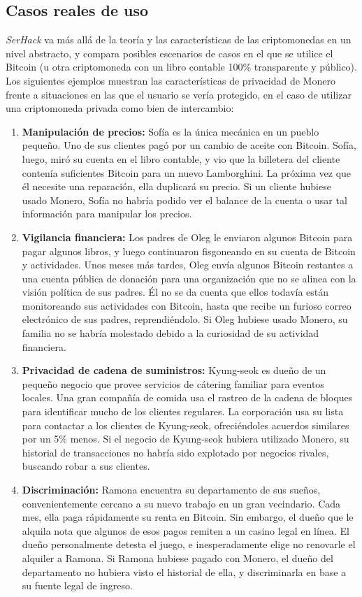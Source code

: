 \documentclass[12pt,a4paper,twoside]{book}
\begin{document}
\subsection{Casos reales de uso}
\textit{SerHack} va más allá de la teoría y las características de las criptomonedas en un nivel abstracto, y compara posibles escenarios de casos en el que se utilice el Bitcoin (u otra criptomoneda con un libro contable 100\% transparente y público). Los siguientes ejemplos muestran las características de privacidad de Monero frente a situaciones en las que el usuario se vería protegido, en el caso de utilizar una criptomoneda privada como bien de intercambio:

\begin{enumerate}
\item \textbf{Manipulación de precios:} Sofía es la única mecánica en un pueblo pequeño. Uno de sus clientes pagó por un cambio de aceite con Bitcoin. Sofía, luego, miró su cuenta en el libro contable, y vio que la billetera del cliente contenía suficientes Bitcoin para un nuevo Lamborghini. La próxima vez que él necesite una reparación, ella duplicará su precio. Si un cliente hubiese usado Monero, Sofía no habría podido ver el balance de la cuenta o usar tal información para manipular los precios.
\item \textbf{Vigilancia financiera:} Los padres de Oleg le enviaron algunos Bitcoin para pagar algunos libros, y luego continuaron fisgoneando en su cuenta de Bitcoin y actividades. Unos meses más tardes, Oleg envía algunos Bitcoin restantes a una cuenta pública de donación para una organización que no se alinea con la visión política de sus padres. Él no se da cuenta que ellos todavía están monitoreando sus actividades con Bitcoin, hasta que recibe un furioso correo electrónico de sus padres, reprendiéndolo. Si Oleg hubiese usado Monero, su familia no se habría molestado debido a la curiosidad de su actividad financiera.
\item \textbf{Privacidad de cadena de suministros:} Kyung-seok es dueño de un pequeño negocio que provee servicios de cátering familiar para eventos locales. Una gran compañía de comida usa el rastreo de la cadena de bloques para identificar mucho de los clientes regulares. La corporación usa su lista para contactar a los clientes de Kyung-seok, ofreciéndoles acuerdos similares por un 5\% menos. Si el negocio de Kyung-seok hubiera utilizado Monero, su historial de transacciones no habría sido explotado por negocios rivales, buscando robar a sus clientes.
\item \textbf{Discriminación:} Ramona encuentra su departamento de sus sueños, convenientemente cercano a su nuevo trabajo en un gran vecindario. Cada mes, ella paga rápidamente su renta en Bitcoin. Sin embargo, el dueño que le alquila nota que algunos de esos pagos remiten a un casino legal en línea. El dueño personalmente detesta el juego, e inesperadamente elige no renovarle el alquiler a Ramona. Si Ramona hubiese pagado con Monero, el dueño del departamento no hubiera visto el historial de ella, y discriminarla en base a su fuente legal de ingreso.

\end{enumerate}
\end{document}
